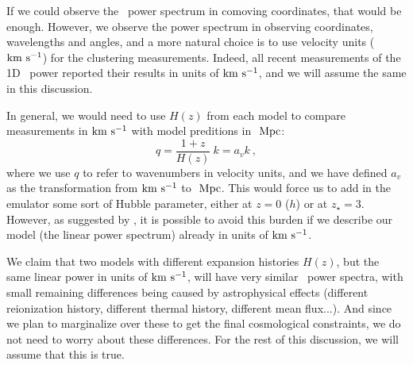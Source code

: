 If we could observe the \lya\ power spectrum in comoving coordinates, that 
would be enough. 
However, we observe the power spectrum in observing coordinates, wavelengths
and angles, and a more natural choice is to use velocity units (${\rm km~s^{-1}}$) for 
the clustering measurements. 
Indeed, all recent measurements of the 1D \lya\ power reported their results
in units of ${\rm km~s^{-1}}$, and we will assume the same in this discussion.

In general, we would need to use $H(z)$ from each model to compare 
measurements in ${\rm km~s^{-1}}$ with model preditions in $\ \text{Mpc}$:
\begin{equation}
 q = \frac{1+z}{H(z)} ~ k = a_v k~,
\end{equation}
where we use $q$ to refer to wavenumbers in velocity units, and we have 
defined $a_v$ as the transformation from ${\rm km~s^{-1}}$ to $\ \text{Mpc}$.
This would force us to add in the emulator some sort of Hubble 
parameter, either at $z=0$ ($h$) or at $z_\star=3$. 
However, as suggested by \cite{McDonald2005a}, it is possible to avoid this
burden if we describe our model (the linear power spectrum) already in 
units of ${\rm km~s^{-1}}$. 

We claim that two models with different expansion histories $H(z)$, but the
same linear power in units of ${\rm km~s^{-1}}$, will have very similar \lya\ power
spectra, with small remaining differences being caused by astrophysical 
effects (different reionization history, different thermal history, different
mean flux...). 
And since we plan to marginalize over these to get the final cosmological 
constraints, we do not need to worry about these differences. 
For the rest of this discussion, we will assume that this is true.

